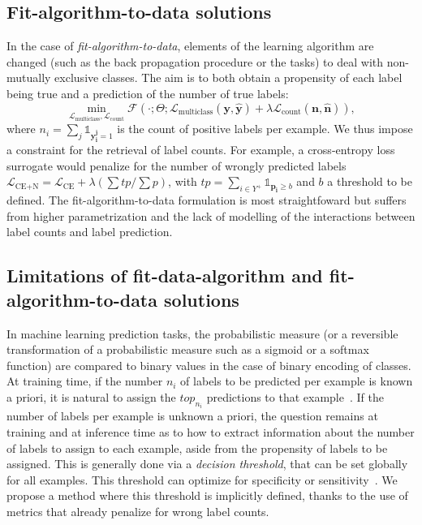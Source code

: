 \subsection{Fit-algorithm-to-data solutions}
In the case of \emph{fit-algorithm-to-data}, elements of the learning algorithm are changed (such as the back propagation procedure or the tasks) to deal with non-mutually exclusive classes. 
The aim is to both obtain a propensity of each label being true and a prediction of the number of true labels:
%
\begin{equation}
\underset{\mathcal{L}_{\text {multiclass}}, \mathcal{L}_{\text {count}}}
{\min} \mathcal{F}\left(\cdot ; \Theta; \mathcal{L}_{\text {multiclass}}
(\mathbf{y}, \hat{\mathbf{y}}) + \lambda \mathcal{L}_{\text {count}}
(\mathbf{n}, \hat{\mathbf{n}})\right),
\end{equation}
%
where \(n_i = \sum_j \mathds{1}_{\mathbf{y_i^j} = 1}\) is the count of
positive labels per example. We thus impose a constraint for the retrieval of
label counts. For example, a cross-entropy loss surrogate would penalize for the number of wrongly predicted
labels \(\mathcal{L}_{\text {CE+N}}= \mathcal{L}_{\text {CE}} + \lambda (\sum
tp / \sum p)\), with \(t p=\sum_{i \in Y^{+}} \mathds{1}_{\mathbf{p_i} \geq
b}\) and \(b\) a threshold to be defined. The fit-algorithm-to-data
formulation is most straightfoward but suffers from higher parametrization and
the lack of modelling of the interactions between label counts and label
prediction.

\subsection{Limitations of fit-data-algorithm and fit-algorithm-to-data solutions}

In machine learning prediction tasks, the probabilistic measure (or a reversible
transformation of a probabilistic measure such as a sigmoid or a softmax
function) are compared to binary values in the case of binary encoding of
classes. At training time, if the number $n_i$ of labels to be predicted per
example is known a priori, it is natural to assign the $top_{n_i}$ predictions
to that example~\cite{lossTopKError, topKmulticlassSVM}. If the number of
labels per example is unknown a priori, the question remains at training and at inference time
as to how to extract information about the number of labels to assign to each
example, aside from the propensity of labels to be assigned. This is generally
done via a \emph{decision threshold}, that can be set globally for all
examples. This threshold can optimize for specificity or
sensitivity~\cite{decisionThreshold}. We propose a method where this threshold
is implicitly defined, thanks to the use of metrics that already penalize for
wrong label counts.

